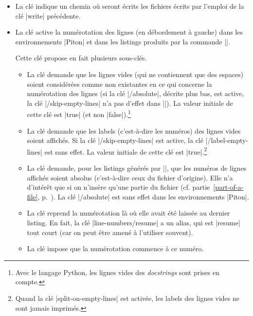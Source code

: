 \documentclass[dvipsnames,svgnames]{article}
\begin{document}
\begin{itemize}
\item {} La clé  indique un chemin où seront écrits les fichiers écrits par
l'emploi de la clé |write| précédente.

\item {} La clé  active la numérotation des lignes (en débordement à
gauche) dans les environnements |{Piton}| et dans les listings produits par la commande |\PitonInputFile|.

Cette clé propose en fait plusieurs sous-clés.
\begin{itemize}
\item La clé  demande que les lignes vides (qui ne contiennent que des
espaces) soient considérées comme non existantes en ce qui concerne la numérotation des lignes (si la clé
|/absolute|, décrite plus bas, est active, la clé |/skip-empty-lines| n'a pas d'effet dans |\PitonInputFile|). La
valeur initiale de cette clé est |true| (et non |false|).\footnote{Avec le langage Python, les lignes vides des \emph{docstrings} sont
  prises en compte.}

\item La clé  demande que les labels (c'est-à-dire les numéros) des
lignes vides soient affichés. Si la clé |/skip-empty-lines| est active, la clé |/label-empty-lines| est sans effet.
La valeur initiale de cette clé est |true|.\footnote{Quand la clé |split-on-empty-lines| est activée, les labels des
  lignes vides ne sont jamais imprimés.}

\item La clé  demande, pour les listings générés par |\PitonInputFile|, que les
numéros de lignes affichés soient absolus (c'est-à-dire ceux du fichier d'origine). Elle n'a d'intérêt que si on
n'insère qu'une partie du fichier (cf. partie~\ref{part-of-a-file}, p.~\pageref{part-of-a-file}). La clé
|/absolute| est sans effet dans les environnements |{Piton}|.

\item La clé  reprend la numérotation là où elle avait été laissée au dernier
listing. En fait, la clé |line-numbers/resume| a un alias, qui est |resume| tout court (car on peut être amené à
l'utiliser souvent).

\item La clé  impose que la numérotation commence à ce numéro. 


\end{itemize}
\end{itemize}
\end{document}
